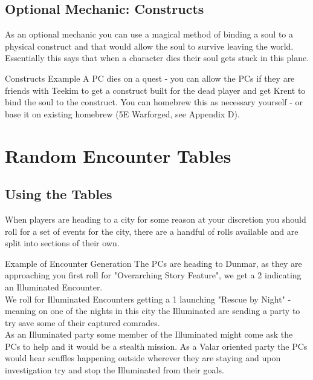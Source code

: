 \documentclass[10pt,twoside,twocolumn]{article}
\begin{document}
\subsection{Optional Mechanic: Constructs}
As an optional mechanic you can use a magical method of binding a soul to a physical construct and that would allow the soul to survive leaving the world. Essentially this says that when a character dies their soul gets stuck in this plane.\\

\begin{paperbox}{Constructs Example}
A PC dies on a quest - you can allow the PCs if they are friends with Teekim to get a construct built for the dead player and get Krent to bind the soul to the construct. You can homebrew this as necessary yourself - or base it on existing homebrew (5E Warforged, see Appendix D).
\end{paperbox}

\section{Random Encounter Tables}

\subsection{Using the Tables}
When players are heading to a city for some reason at your discretion you should roll for a set of events for the city, there are a handful of rolls available and are split into sections of their own.\\

\begin{paperbox}{Example of Encounter Generation}
The PCs are heading to Dunmar, as they are approaching you first roll for "Overarching Story Feature", we get a 2 indicating an Illuminated Encounter.\\

We roll for Illuminated Encounters getting a 1 launching "Rescue by Night" - meaning on one of the nights in this city the Illuminated are sending a party to try save some of their captured comrades.\\

As an Illuminated party some member of the Illuminated might come ask the PCs to help and it would be a stealth mission. As a Valar oriented party the PCs would hear scuffles happening outside wherever they are staying and upon investigation try and stop the Illuminated from their goals.
\end{paperbox}
\end{document}
